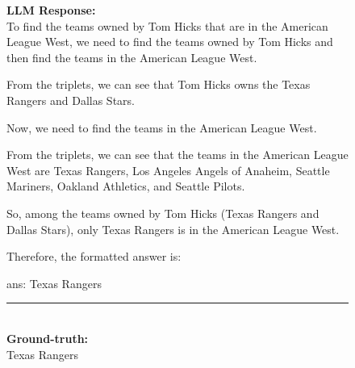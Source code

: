 \begin{figure}
\begin{tcolorbox}[colback=gray!5!white, colframe=gray!75!black, title=CWQ-WebQTrn-2152\_92fba37c9723caee68665ad9a5e4a468]
\textbf{LLM Response:}\\
To find the teams owned by Tom Hicks that are in the American League West, we need to find the teams owned by Tom Hicks and then find the teams in the American League West.



From the triplets, we can see that Tom Hicks owns the Texas Rangers and Dallas Stars.



Now, we need to find the teams in the American League West.



From the triplets, we can see that the teams in the American League West are Texas Rangers, Los Angeles Angels of Anaheim, Seattle Mariners, Oakland Athletics, and Seattle Pilots.



So, among the teams owned by Tom Hicks (Texas Rangers and Dallas Stars), only Texas Rangers is in the American League West.



Therefore, the formatted answer is:



ans: Texas Rangers

\rule{\linewidth}{0.4pt}
\\
\textbf{Ground-truth:}\\
Texas Rangers

\end{tcolorbox}
\end{figure}




